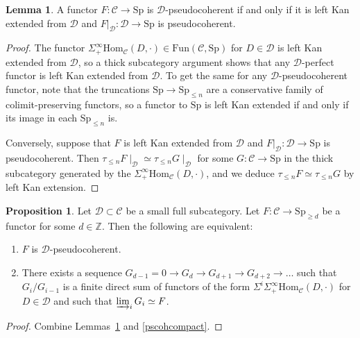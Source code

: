 \documentclass{amsart}
\renewcommand{\hom}{\mathrm{Hom}}
\newcommand{\Sp}{\mathrm{Sp}}
\newcommand{\fun}{\mathrm{Fun}}
\theoremstyle{definition}
\newtheorem{proposition}[definition]{Proposition}
\newtheorem{lemma}[definition]{Lemma}
\begin{document}
\begin{lemma} 
\label{lkanpscoh}
A functor $F: \mathcal{C} \to \Sp$ is $\mathcal{D}$-pseudocoherent if and only if
it is left Kan extended from $\mathcal{D}$ and $F|_{\mathcal{D}}: \mathcal{D}
\to \Sp$ is
pseudocoherent.  
\end{lemma} 
\begin{proof} 
The functor $\Sigma^\infty_+ \hom_{\mathcal{C}}(D, \cdot) \in
\fun(\mathcal{C}, \Sp)$ for $D \in \mathcal{D}$ is left Kan extended from
$\mathcal{D}$, so a thick subcategory argument shows that any
$\mathcal{D}$-perfect functor is left Kan extended from $\mathcal{D}$.  To get
the same for any $\mathcal{D}$-pseudocoherent functor, note that the
truncations $\Sp\rightarrow \Sp_{\leq n}$ are a conservative family of
colimit-preserving functors, so a functor to $\Sp$ is left Kan extended if and
only if its image in each $\Sp_{\leq n}$ is.

Conversely, suppose that $F$ is left Kan extended from $\mathcal{D}$ and $F|_{\mathcal{D}}: \mathcal{D}
\to \Sp$ is pseudocoherent.  Then $\tau_{\leq n}F\mid_\mathcal{D}\simeq \tau_{\leq n}G\mid_\mathcal{D}$ for some $G:\mathcal{C}\rightarrow\Sp$ in the thick subcategory generated by the $\Sigma^\infty_+ \hom_{\mathcal{C}}(D, \cdot)$, and we deduce $\tau_{\leq n}F\simeq \tau_{\leq n}G$ by left Kan extension.
\end{proof} 


\begin{proposition} 
\label{pscohfilt2}
Let $\mathcal{D} \subset \mathcal{C}$ be a small full subcategory. 
Let $F: \mathcal{C} \to \Sp_{\geq d}$ be a functor for some $d \in \mathbb{Z}$. 
Then the following are equivalent: 
\begin{enumerate}
\item $F$ is $\mathcal{D}$-pseudocoherent.  
\item 
There exists a sequence $G_{d-1} = 0 \to G_d \to G_{d+1} \to G_{d+2} \to \dots $ such that 
$G_i/G_{i-1}$ is a finite direct sum of functors of the form $\Sigma^i
\Sigma^\infty_+ \hom_{\mathcal{C}}(D, \cdot)$ for $D \in \mathcal{D}$ and such that
$\varinjlim_i G_i \simeq F$. 
\end{enumerate}
\end{proposition}
\begin{proof} 
Combine Lemmas~\ref{lkanpscoh} and \ref{pscohcompact}. 
\end{proof} 
\end{document}
